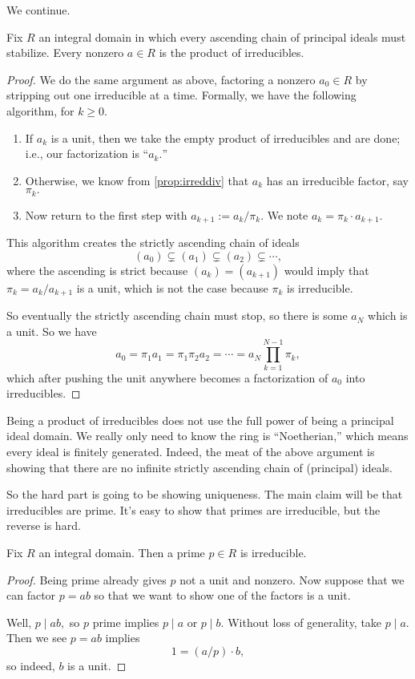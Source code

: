 \documentclass[../notes.tex]{subfiles}
\begin{document}
We continue.
\begin{proposition} \label{prop:existfact}
	Fix $R$ an integral domain in which every ascending chain of principal ideals must stabilize. Every nonzero $a\in R$ is the product of irreducibles.
\end{proposition}
\begin{proof}
	We do the same argument as above, factoring a nonzero $a_0\in R$ by stripping out one irreducible at a time. Formally, we have the following algorithm, for $k\ge0.$
	\begin{enumerate}
		\item If $a_k$ is a unit, then we take the empty product of irreducibles and are done; i.e., our factorization is ``$a_k.$''
		\item Otherwise, we know from \autoref{prop:irreddiv} that $a_k$ has an irreducible factor, say $\pi_k.$
		\item Now return to the first step with $a_{k+1}:=a_k/\pi_k.$ We note $a_k=\pi_k\cdot a_{k+1}.$
	\end{enumerate}
	This algorithm creates the strictly ascending chain of ideals
	\[(a_0)\subsetneq(a_1)\subsetneq(a_2)\subsetneq\cdots,\]
	where the ascending is strict because $(a_k)=(a_{k+1})$ would imply that $\pi_k=a_k/a_{k+1}$ is a unit, which is not the case because $\pi_k$ is irreducible.

	So eventually the strictly ascending chain must stop, so there is some $a_N$ which is a unit. So we have
	\[a_0=\pi_1a_1=\pi_1\pi_2a_2=\cdots=a_N\prod_{k=1}^{N-1}\pi_k,\]
	which after pushing the unit anywhere becomes a factorization of $a_0$ into irreducibles.
\end{proof}
\begin{remark}
	Being a product of irreducibles does not use the full power of being a principal ideal domain. We really only need to know the ring is ``Noetherian,'' which means every ideal is finitely generated. Indeed, the meat of the above argument is showing that there are no infinite strictly ascending chain of (principal) ideals.
\end{remark}
So the hard part is going to be showing uniqueness. The main claim will be that irreducibles are prime. It's easy to show that primes are irreducible, but the reverse is hard.
\begin{lemma}
	Fix $R$ an integral domain. Then a prime $p\in R$ is irreducible.
\end{lemma}
\begin{proof}
	Being prime already gives $p$ not a unit and nonzero. Now suppose that we can factor $p=ab$ so that we want to show one of the factors is a unit.

	Well, $p\mid ab,$ so $p$ prime implies $p\mid a$ or $p\mid b.$ Without loss of generality, take $p\mid a.$ Then we see $p=ab$ implies
	\[1=(a/p)\cdot b,\]
	so indeed, $b$ is a unit.
\end{proof}
\end{document}

